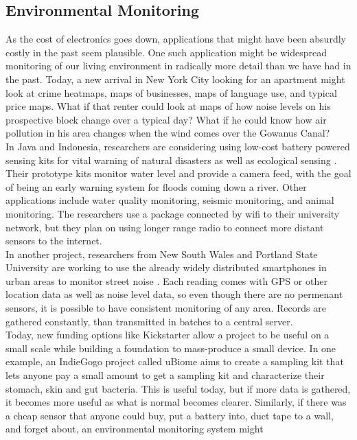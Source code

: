 \documentclass[conference]{IEEEtran}
\begin{document}
\subsection{Environmental Monitoring}
As the cost of electronics goes down, applications that might have been
absurdly costly in the past seem plausible.  One such application might be
widespread monitoring of our living environment in radically more detail
than we have had in the past.  Today, a new arrival in New York City 
looking for an apartment might look at crime heatmaps, maps of businesses,
maps of language use, and typical price maps.  What if that renter could 
look at maps of how noise levels on his prospective block change over a typical
day?  What if he could know how air pollution in his area changes when
the wind comes over the Gowanus Canal?\\
In Java and Indonesia, researchers are considering using low-cost battery powered
sensing kits for vital warning of natural disasters as well as ecological
sensing \cite{envmon:wira}.  Their prototype kits monitor water level and provide
a camera feed, with the goal of being an early warning system for floods coming
down a river.  Other applications include water quality monitoring, seismic 
monitoring, and animal monitoring.  The researchers use a package connected by wifi to their 
university network, but they plan on using longer range radio to connect
more distant sensors to the internet.\\
In another project, researchers from New South Wales and Portland
State University are working to use the already widely distributed smartphones
in urban areas to monitor street noise \cite{envmon:rana}.  Each reading comes with GPS or other
location data as well as noise level data, so even though there are no permenant
sensors, it is possible to have consistent monitoring of any area.  Records are
gathered constantly, than transmitted in batches to a central server. \\
Today, new funding options like Kickstarter allow a project to be useful on a 
small scale while building a foundation to mass-produce a small device.  In 
one example, an IndieGogo project called uBiome \cite{envmon:rich} aims to 
create a sampling kit that lets anyone pay a small amount to get a sampling kit
and characterize their stomach, skin and gut bacteria.  This is
useful today, but if more data is gathered, it becomes more useful as what is
normal becomes clearer.  Similarly, if there was a cheap sensor that anyone could buy, put a battery into,
duct tape to a wall, and forget about, an environmental monitoring system might
\end{document}
